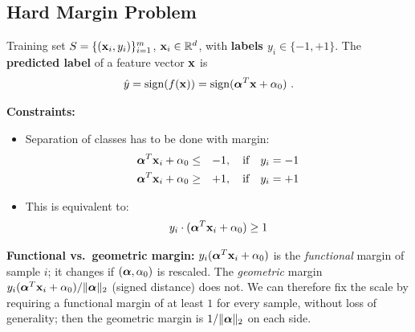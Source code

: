 \subsection{Hard Margin Problem}

Training set $S=\{(\bm{\mathrm{x}}_i, y_i)\}_{i=1}^m$, $\bm{\mathrm{x}}_i\in\mathbb{R}^d$, with \textbf{labels $y_i\in\{-1,+1\}$}.
The \textbf{predicted label} of a feature vector $\bm{\mathrm{x}}$ is
\begin{displaymath}
  \hat y = \operatorname{sign}(f(\bm{\mathrm{x}})) = \operatorname{sign}(\bm{\mathrm{\alpha}}^T\bm{\mathrm{x}}+\alpha_0)~.
\end{displaymath}

\textbf{Constraints:}
  \begin{itemize}
    \item Separation of classes has to be done with margin:
      \begin{eqnarray*}
        \bm{\mathrm{\alpha}}^T \bm{\mathrm{x}}_i+\alpha_0 &\leq& -1, \quad \mbox{if} \quad y_i= -1 \\
        \bm{\mathrm{\alpha}}^T \bm{\mathrm{x}}_i+\alpha_0 &\geq& +1, \quad \mbox{if} \quad y_i= +1
      \end{eqnarray*}
    \item This is equivalent to:
      \begin{displaymath}
        y_i\cdot (\bm{\mathrm{\alpha}}^T\bm{\mathrm{x}}_i + \alpha_0) \geq 1
      \end{displaymath}
  \end{itemize}
  \textbf{Functional vs.\ geometric margin:} $y_i(\bm{\mathrm{\alpha}}^T\bm{\mathrm{x}}_i+\alpha_0)$ is the \emph{functional} margin of sample $i$; it changes if $(\bm{\mathrm{\alpha}},\alpha_0)$ is rescaled. The \emph{geometric} margin $y_i(\bm{\mathrm{\alpha}}^T\bm{\mathrm{x}}_i+\alpha_0)/\|\bm{\mathrm{\alpha}}\|_2$ (signed distance) does not. We can therefore fix the scale by requiring a functional margin of at least $1$ for every sample, without loss of generality; then the geometric margin is $1/\|\bm{\mathrm{\alpha}}\|_2$ on each side.

